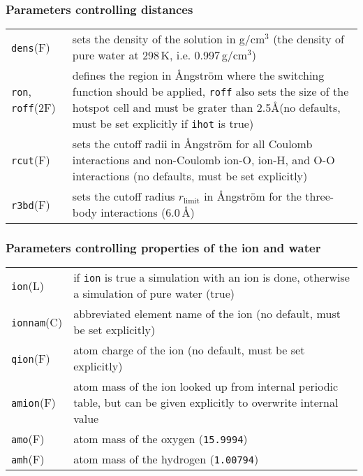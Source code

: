 \documentclass[12pt,a4paper]{article}
\newcommand{\Option}[1]{\texttt{#1}}
\newcommand{\OptionValue}[1]{\texttt{#1}}
\begin{document}
\subsubsection*{Parameters controlling distances}

\begin{tabularx}{\columnwidth}{p{}X}
  \Option{dens}(F) & sets the density of the solution in g/cm$^3$
  (the density of pure water at 298\,K, i.e. 0.997\,g/cm$^3$) \\
  \Option{ron}, \Option{roff}(2F) & defines the region in \AA{}ngstr\"om where
  the switching function\cite{Stillinger:JChemPhys-60-4-1545} should be applied,
  \Option{roff} also sets the size of the hotspot cell and must be grater than
  2.5\AA (no defaults, must be set explicitly if \Option{ihot} is true) \\
  \Option{rcut}(F) & sets the cutoff radii in \AA{}ngstr\"om for all Coulomb
  interactions and non-Coulomb ion-O, ion-H, and O-O interactions
  (no defaults, must be set explicitly) \\
  \Option{r3bd}(F) & sets the cutoff radius $r_{\text{limit}}$ in
  \AA{}ngstr\"om for the three-body interactions (6.0\,\AA)
\end{tabularx}


\subsubsection*{Parameters controlling properties of the ion and water}

\begin{tabularx}{\columnwidth}{p{}X}
  \Option{ion}(L) & if \Option{ion} is true a simulation with an ion is done,
  otherwise a simulation of pure water (true) \\
  \Option{ionnam}(C) & abbreviated element name of the ion (no default, must be
  set explicitly) \\
  \Option{qion}(F) & atom charge of the ion (no default, must be set
  explicitly) \\
  \Option{amion}(F) & atom mass of the ion looked up from internal
  periodic table, but can be given explicitly to overwrite internal value \\
  \Option{amo}(F) & atom mass of the oxygen (\OptionValue{15.9994}) \\
  \Option{amh}(F) & atom mass of the hydrogen (\OptionValue{1.00794}) \\
\end{tabularx}
\end{document}
